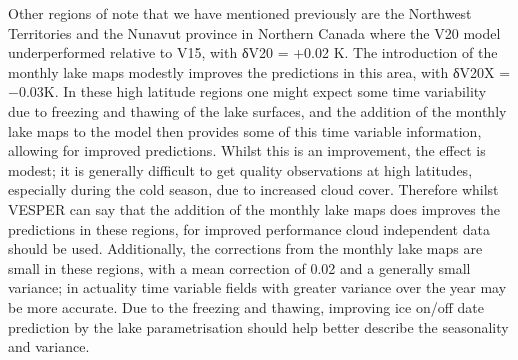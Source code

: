 \documentclass[hess, twostagejnl]{copernicus}
\begin{document}
\noindent Other regions of note that we have mentioned previously are the Northwest Territories and the Nunavut province in Northern Canada where the V20 model underperformed relative to V15, with δV20 = +0.02 K. The introduction of the monthly lake maps modestly improves the predictions in this area, with δV20X = −0.03K. In these high latitude regions one might expect some time variability due to freezing and thawing of the lake surfaces, and the addition of the monthly lake maps to the model then provides some of this time variable information, allowing for improved predictions. Whilst this is an improvement, the effect is modest; it is generally difficult to get quality observations at high latitudes, especially during the cold season, due to increased cloud cover. Therefore whilst VESPER can say that the addition of the monthly lake maps does improves the predictions in these regions, for improved performance cloud independent data should be used. Additionally, the corrections from the monthly lake maps are small in these regions, with a mean correction of 0.02 and a generally small variance; in actuality time variable fields with greater variance over the year may be more accurate. Due to the freezing and thawing, improving ice on/off date prediction by the lake parametrisation should help better describe the seasonality and variance.
\end{document}
